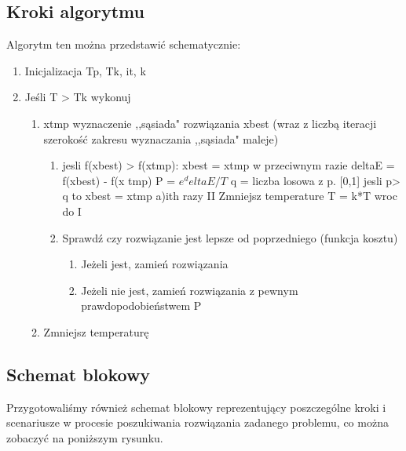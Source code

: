 \documentclass[twoside]{projektInzynierskiMS1}
\newcommand{\si}{ś}
\begin{document}
		\subsection{Kroki algorytmu}
		
		Algorytm ten można przedstawić schematycznie:

\begin{enumerate}
	\item Inicjalizacja Tp, Tk, it, k
	\item Je\si li T > Tk wykonuj
	\begin{enumerate}
		\item xtmp wyznaczenie ,,sąsiada" rozwiązania xbest (wraz z liczbą iteracji szeroko\si ć zakresu wyznaczania ,,sąsiada" maleje)
		\begin{enumerate}
			\item jesli f(xbest) > f(xtmp):
xbest = xtmp
w przeciwnym razie
deltaE = f(xbest) - f(x tmp)
P = $e ^ deltaE/T$
q = liczba losowa z p. [0,1]
jesli p> q
to xbest = xtmp
a)ith razy
II Zmniejsz temperature T = k*T
wroc do I
			\item Sprawdź czy rozwiązanie jest lepsze od poprzedniego (funkcja kosztu)
			\begin{enumerate}
				\item Jeżeli jest, zamień rozwiązania
				\item Jeżeli nie jest, zamień rozwiązania z pewnym prawdopodobieństwem P
			\end{enumerate}
		\end{enumerate}
		\item Zmniejsz temperaturę
	\end{enumerate}
\end{enumerate}
	


\subsection{Schemat blokowy}
Przygotowali\si my również schemat blokowy reprezentujący poszczególne kroki i scenariusze w procesie poszukiwania rozwiązania zadanego problemu, co można zobaczyć na poniższym rysunku.
\end{document}

